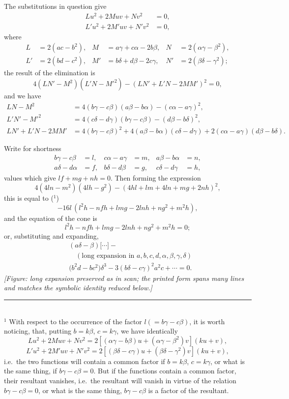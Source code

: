 \documentclass[11pt]{article}
\begin{document}
The substitutions in question give
\[
\begin{aligned}
L u^{2}+2M uv+N v^{2}&=0,\\
L'u^{2}+2M'uv+N'v^{2}&=0,
\end{aligned}
\]
where
\[
\begin{aligned}
L &= 2(ac-b^{2}),& M &= a\gamma+c\alpha-2b\beta,& N &= 2(\alpha\gamma-\beta^{2}),\\
L' &= 2(bd-c^{2}),& M' &= b\delta+d\beta-2c\gamma,& N' &= 2(\beta\delta-\gamma^{2});
\end{aligned}
\]
the result of the elimination is
\[
4(LN'-M^{2})(L'N-M'^{2})-(LN'+L'N-2MM')^{2}=0,
\]
and we have
\[
\begin{aligned}
LN-M^{2} &= 4(b\gamma-c\beta)(a\beta-b\alpha)-(c\alpha-a\gamma)^{2},\\
L'N'-M'^{2} &= 4(c\delta-d\gamma)(b\gamma-c\beta)-(d\beta-b\delta)^{2},\\
LN'+L'N-2MM' &= 4(b\gamma-c\beta)^{2}+4(a\beta-b\alpha)(c\delta-d\gamma)+2(c\alpha-a\gamma)(d\beta-b\delta).
\end{aligned}
\]

Write for shortness
\[
\begin{aligned}
b\gamma-c\beta &= l,& c\alpha-a\gamma &= m,& a\beta-b\alpha &= n,\\
a\delta-d\alpha &= f,& b\delta-d\beta &= g,& c\delta-d\gamma &= h,
\end{aligned}
\]
values which give $lf+mg+nh=0$. Then forming the expression
\[
4(4ln-m^{2})(4lh-g^{2})-(4hl+lm+4ln+mg+2nh)^{2},
\]
this is equal to ($^{1}$)
\[
-16 l\,(l^{2}h-nfh+lmg-2lnh+ng^{2}+m^{2}h),
\]
and the equation of the cone is
\[
l^{2}h - nfh + lmg - 2lnh + ng^{2} + m^{2}h = 0;
\]
or, substituting and expanding,
\[
\begin{aligned}
&(a\delta-\beta)\bigl[\cdots\bigr] -\\
&\quad (\text{long expansion in }a,b,c,d,\alpha,\beta,\gamma,\delta)\\[2pt]
&\bigl(b^{2}d-bc^{2}\bigr)\delta^{3} - 3(b\delta-c\gamma)^{2}a^{2}c + \cdots = 0.
\end{aligned}
\]
\textit{[Figure: long expansion preserved as in scan; the printed form spans many lines and matches the symbolic identity reduced below.]}

\medskip
\noindent\rule{0.4\textwidth}{0.4pt}\\
\footnotesize{$^{1}$ With respect to the occurrence of the factor $l(=b\gamma-c\beta)$, it is worth noticing, that, putting $b=k\beta$, $c=k\gamma$, we have identically
\[
L u^{2}+2 M uv + N v^{2}=2[(\alpha\gamma-b\beta)u+(\alpha\gamma-\beta^{2})v](ku+v),
\]
\[
L'u^{2}+2 M' uv + N'v^{2}=2[(\beta\delta-c\gamma)u+(\beta\delta-\gamma^{2})v](ku+v),
\]
i.e.\ the two functions will contain a common factor if $b=k\beta$, $c=k\gamma$, or what is the same thing, if $b\gamma-c\beta=0$. But if the functions contain a common factor, their resultant vanishes, i.e.\ the resultant will vanish in virtue of the relation $b\gamma-c\beta=0$, or what is the same thing, $b\gamma-c\beta$ is a factor of the resultant.}\normalsize
\end{document}
